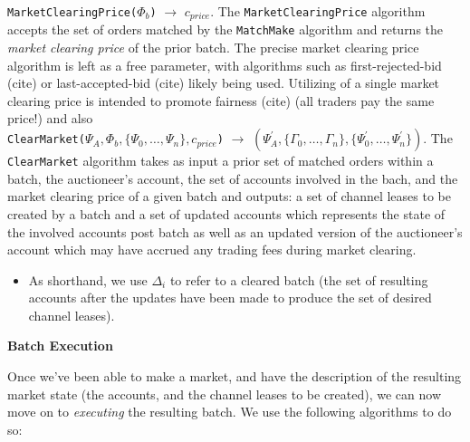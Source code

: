\documentclass[12pt,a4paper]{article}
\theoremstyle{definition}
\begin{document}

 
\texttt{MarketClearingPrice($\Phi_b$)} $\rightarrow$ $c_{price}$. The
\texttt{MarketClearingPrice} algorithm accepts the set of orders matched by the
\texttt{MatchMake} algorithm and returns the \emph{market clearing price} of
the prior batch. The precise market clearing price algorithm is left as a free
parameter, with algorithms such as first-rejected-bid (cite) or
last-accepted-bid (cite) likely being used. Utilizing of a single market
clearing price is intended to promote fairness (cite) (all traders pay the same
price!) and also  \\



\texttt{ClearMarket($\Psi_{A}, \Phi_b, \{\Psi_0, \dots, \Psi_n\}, c_{price}$)}
$\rightarrow$ $(\Psi_{A}^\prime, \{\Gamma_0, \dots, \Gamma_n\},
\{\Psi_{0}^\prime, \dots, \Psi_{n}^\prime\})$. The \texttt{ClearMarket}
algorithm takes as input a prior set of matched orders within a batch, the
auctioneer's account, the set of accounts involved in the bach, and the market
clearing price of a given batch and outputs: a set of channel leases to be
created by a batch and a set of updated accounts which represents the state of
the involved accounts post batch as well as an updated version of the
auctioneer's account which may have accrued any trading fees during market
clearing.


\begin{itemize}
    \item As shorthand, we use $\Delta_i$ to refer to a cleared batch (the set of
            resulting accounts after the updates have been made to produce the
            set of desired channel leases).
\end{itemize}


\begin{center}
    \textbf{Batch Execution}
\end{center}

Once we've been able to make a market, and have the description of the
resulting market state (the accounts, and the channel leases to be created), we
can now move on to \emph{executing} the resulting batch. We use the following
algorithms to do so:  \\ 
\end{document}
